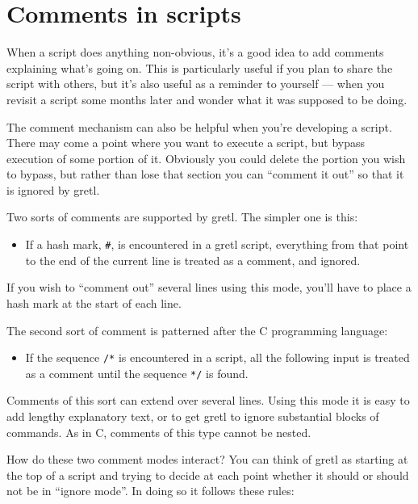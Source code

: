 \chapter{Comments in scripts}
\label{chap:comments}

When a script does anything non-obvious, it's a good idea to add
comments explaining what's going on.  This is particularly useful if
you plan to share the script with others, but it's also useful as a
reminder to yourself --- when you revisit a script some months later
and wonder what it was supposed to be doing.

The comment mechanism can also be helpful when you're developing a
script.  There may come a point where you want to execute a script,
but bypass execution of some portion of it.  Obviously you could
delete the portion you wish to bypass, but rather than lose that
section you can ``comment it out'' so that it is ignored by
gretl.

Two sorts of comments are supported by gretl.  The simpler one
is this:

\begin{itemize}
\item If a hash mark, \texttt{\#}, is encountered in a gretl script, 
  everything from that point to the end of the current line is treated as a 
  comment, and ignored.
\end{itemize}

If you wish to ``comment out'' several lines using this mode, you'll
have to place a hash mark at the start of each line.

The second sort of comment is patterned after the C programming language:

\begin{itemize}
\item If the sequence \texttt{/*} is encountered in a script, all the
  following input is treated as a comment until the sequence \texttt{*/}
  is found.
\end{itemize}

Comments of this sort can extend over several lines.  Using this mode
it is easy to add lengthy explanatory text, or to get gretl to
ignore substantial blocks of commands.  As in C, comments of this
type cannot be nested.

How do these two comment modes interact?  You can think of
gretl as starting at the top of a script and trying to decide at
each point whether it should or should not be in ``ignore mode''.  In
doing so it follows these rules:


